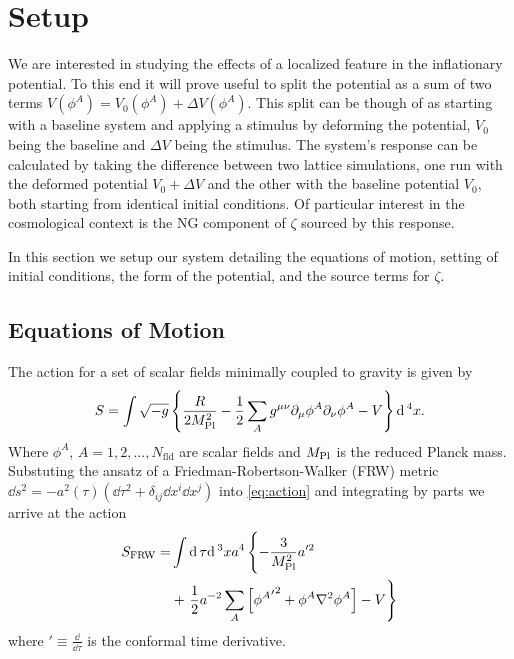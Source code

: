 
\section{Setup} \label{sec:setup}
We are interested in studying the effects of a localized feature in the inflationary potential.
To this end it will prove useful to split the potential as a sum of two terms $V(\phi^A) = V_0(\phi^A) + \Delta V(\phi^A)$.
This split can be though of as starting with a baseline system and applying a stimulus by deforming the potential, $V_0$ being the baseline and $\Delta V$ being the stimulus.
The system's response can be calculated by taking the difference between two lattice simulations, one run with the deformed potential $V_0+\Delta V$ and the other with the baseline potential $V_0$, both starting from identical initial conditions.
Of particular interest in the cosmological context is the NG component of $\zeta$ sourced by this response.

In this section we setup our system detailing the equations of motion, setting of initial conditions, the form of the potential, and the source terms for $\zeta$.

\subsection{Equations of Motion}

The action for a set of scalar fields minimally coupled to gravity is given by
\begin{equation} \label{eq:action}
  S = \int \sqrt{-g}\left\{\frac{R}{2M_{\mathrm{Pl}}^2} - \frac{1}{2}\sum_Ag^{\mu\nu}\partial_\mu\phi^A\partial_\nu\phi^A - V \right\}\mathrm{d}\,^4x.
\end{equation}
Where $\phi^A$, $A=1,2,...,N_\mathrm{fld}$ are scalar fields and $M_{\mathrm{Pl}}$ is the reduced Planck mass. 
Substuting the ansatz of a Friedman-Robertson-Walker (FRW) metric $\dd s^2 = -a^2(\tau)\left( \dd\tau^2 + \delta_{ij}\dd x^i\dd x^j \right)$ into \eqref{eq:action} and integrating by parts we arrive at the action
\begin{align} \label{eq:actionFRW}
  \begin{split}
    S_{\mathrm{FRW}} = &\int \dd\tau\dd^3xa^4\left\{
    - \frac{3}{\mpl^2}a'^2 \vphantom{\sum_A}\right. \\
    & + \left.\frac{1}{2}a^{-2}\sum_A\left[{{\phi^A}'}^2
      + \phi^A\nabla^2\phi^A\right] %
      - V \right\}
    \end{split}
\end{align}
where ${}' \equiv \frac{\dd}{\dd\tau}$ is the conformal time derivative.

